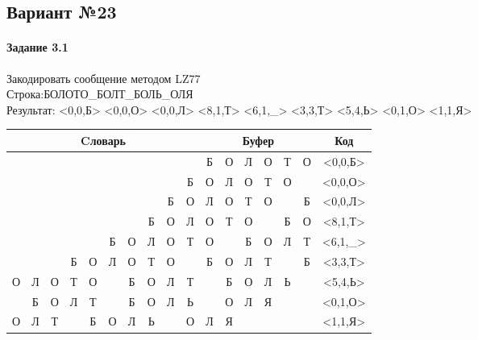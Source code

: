 \documentclass[a4paper, 12pt]{article}
\begin{document}
\pagebreak
\subsection{Вариант №23}
\paragraph{Задание 3.1}

Закодировать сообщение методом LZ77\\
Строка:БОЛОТО\_БОЛТ\_БОЛЬ\_ОЛЯ\\
Результат: <0,0,Б> <0,0,О> <0,0,Л> <8,1,Т> <6,1,\_> <3,3,Т> <5,4,Ь> <0,1,О> <1,1,Я>\\
\begin{table}[h!]
\centering
\begin{tabular}{|c|c|c|c|c|c|c|c|c|c|c|c|c|c|c|c|c|} 
\hline
\multicolumn{10}{|c|}{Cловарь} & \multicolumn{6}{c|}{Буфер} & Код  \\ \hline
  &   &   &   &   &   &   &   &   &   & \cellcolor[HTML]{8CE4F6} Б & О & Л & О & Т & О & <0,0,Б>
\\ \hline
  &   &   &   &   &   &   &   &   & Б & \cellcolor[HTML]{8CE4F6} О & Л & О & Т & О &   & <0,0,О>
\\ \hline
  &   &   &   &   &   &   &   & Б & О & \cellcolor[HTML]{8CE4F6} Л & О & Т & О &   & Б & <0,0,Л>
\\ \hline
  &   &   &   &   &   &   & Б & \cellcolor[HTML]{FFFF00} О & Л & \cellcolor[HTML]{FFFF00} О & \cellcolor[HTML]{8CE4F6} Т & О &   & Б & О & <8,1,Т>
\\ \hline
  &   &   &   &   & Б & \cellcolor[HTML]{FFFF00} О & Л & О & Т & \cellcolor[HTML]{FFFF00} О & \cellcolor[HTML]{8CE4F6}   & Б & О & Л & Т & <6,1,\_>
\\ \hline
  &   &   & \cellcolor[HTML]{FFFF00} Б & \cellcolor[HTML]{FFFF00} О & \cellcolor[HTML]{FFFF00} Л & О & Т & О &   & \cellcolor[HTML]{FFFF00} Б & \cellcolor[HTML]{FFFF00} О & \cellcolor[HTML]{FFFF00} Л & \cellcolor[HTML]{8CE4F6} Т &   & Б & <3,3,Т>
\\ \hline
О & Л & О & Т & О & \cellcolor[HTML]{FFFF00}   & \cellcolor[HTML]{FFFF00} Б & \cellcolor[HTML]{FFFF00} О & \cellcolor[HTML]{FFFF00} Л & Т & \cellcolor[HTML]{FFFF00}   & \cellcolor[HTML]{FFFF00} Б & \cellcolor[HTML]{FFFF00} О & \cellcolor[HTML]{FFFF00} Л & \cellcolor[HTML]{8CE4F6} Ь &   & <5,4,Ь>
\\ \hline
\cellcolor[HTML]{FFFF00}   & Б & О & Л & Т &   & Б & О & Л & Ь & \cellcolor[HTML]{FFFF00}   & \cellcolor[HTML]{8CE4F6} О & Л & Я &   &   & <0,1,О>
\\ \hline
О & \cellcolor[HTML]{FFFF00} Л & Т &   & Б & О & Л & Ь &   & О & \cellcolor[HTML]{FFFF00} Л & \cellcolor[HTML]{8CE4F6} Я &   &   &   &   & <1,1,Я>
\\ \hline
\end{tabular}
\end{table}
\end{document}
